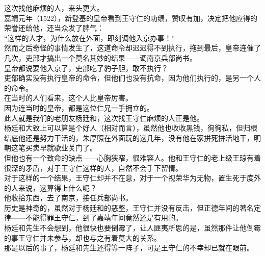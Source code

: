 \begin{multicols}{\theparacolNo}
这次找他麻烦的人，来头更大。\\

嘉靖元年（1522），新登基的皇帝看到王守仁的功绩，赞叹有加，决定把他应得的荣誉还给他，还当众发了脾气：\\

“这样的人才，为什么放在外面，即刻调他入京办事！”\\

然而之后奇怪的事情发生了，这道命令却迟迟得不到执行，拖到最后，皇帝连催了几次，吏部才搞出一个莫名其妙的结果——调南京兵部尚书。\\

皇帝都说要他入京了，吏部吃了豹子胆，敢不执行？\\

吏部确实没有执行皇帝的命令，但他们也没有抗命，因为他们执行的，是另一个人的命令。\\

在当时的人们看来，这个人比皇帝厉害。\\

因为连当时的皇帝，都是这位仁兄一手拥立的。\\

此人就是我们的老朋友杨廷和，这次找王守仁麻烦的人正是他。\\

杨廷和大致上可以算是个好人（相对而言），虽然他也收收黑钱，徇徇私，但归根结底他还是努力干活的，朱厚照在外面玩的这几年，没有他在家拼死拼活地干，明朝这笔买卖早就歇业关门了。\\

但他也有一个致命的缺点——心胸狭窄，很难容人。他和王守仁的老上级王琼有着很深的矛盾，对于王守仁这样的人，自然不会手下留情。\\

对于这样的一个结果，王守仁却并不在意，对于一个视荣华为无物，置生死于度外的人来说，这算得上什么呢？\\

他收拾东西，去了南京，接任兵部尚书。\\

历史是神奇的，虽然对于杨廷和的恶整，王守仁并没有反击，但正德年间的著名定律——不能得罪王守仁，到了嘉靖年间竟然还是有用的。\\

杨廷和先生不会想到，他很快也要倒霉了，让人匪夷所思的是，虽然那件让他倒霉的事王守仁并未参与，却也与之有着莫大的关系。\\

那是以后的事了，杨廷和先生还得等一阵子，可是王守仁的不幸却已就在眼前。\\


\end{multicols}
